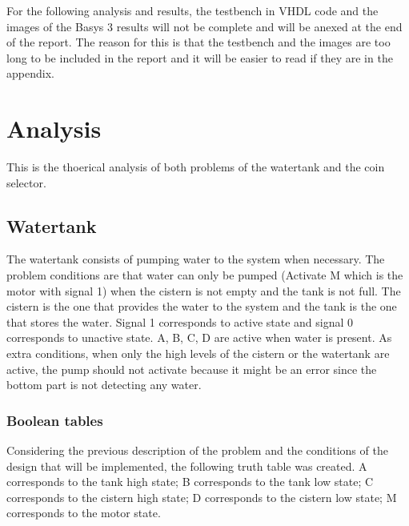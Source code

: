 \documentclass{article}
\begin{document}
\begin{multicols}{2}
	For the following analysis and results, the testbench in VHDL code and the images of the Basys 3 results will not be complete and will be anexed at the end of the report. The reason for this is that the testbench and the images are too long to be included in the report and it will be easier to read if they are in the appendix.

	\section*{Analysis}\label{Analysis}
	This is the thoerical analysis of both problems of the watertank and the coin selector.

	\subsection*{Watertank}\label{Watertank Analysis}
	The watertank consists of pumping water to the system when necessary. The problem conditions are that water can only be pumped (Activate M which is the motor with signal 1) when the cistern is not empty and the tank is not full. The cistern is the one that provides the water to the system and the tank is the one that stores the water. Signal 1 corresponds to active state and signal 0 corresponds to unactive state. A, B, C, D are active when water is present. As extra conditions, when only the high levels of the cistern or the watertank are active, the pump should not activate because it might be an error since the bottom part is not detecting any water.

	\subsubsection*{Boolean tables}\label{Watertank Boolean tables}
	Considering the previous description of the problem and the conditions of the design that will be implemented, the following truth table was created. A corresponds to the tank high state; B corresponds to the tank low state; C corresponds to the cistern high state; D corresponds to the cistern low state; M corresponds to the motor state.


\end{multicols}
\end{document}
